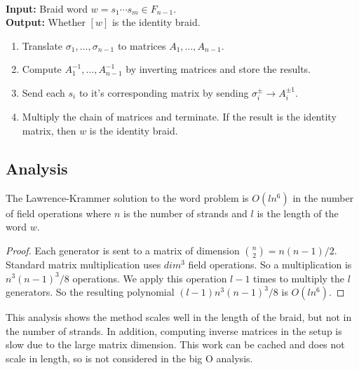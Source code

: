 \documentclass[12pt]{thesis}
\begin{document}
\begin{algorithm}

    ~\\
    \textbf{Input:} Braid word $w = s_{1} \cdots s_{m} \in F_{n-1}$. ~\\
    \textbf{Output:} Whether $[w]$ is the identity braid. 

\begin{enumerate}
    \item Translate $\sigma_{1}, \dots, \sigma_{n-1}$
            to matrices $A_{1}, \ldots, A_{n-1}$.

    \item Compute $A_{1}^{-1}, \ldots, A_{n-1}^{-1}$ by inverting matrices and store the results.

    \item Send each $s_{i}$ to it's corresponding matrix
        by sending $\sigma_{i}^{\pm} \rightarrow A_{i}^{\pm 1}$.

    \item Multiply the chain of matrices and terminate.
          If the result is the identity matrix, then $w$ is the identity braid.
\end{enumerate}

\end{algorithm}

\subsection{Analysis}

\begin{proposition}
    \label{prop:lk-runtime}
    The Lawrence-Krammer solution to the word problem
    is $O(ln^{6})$ in the number of field operations where $n$ is the number
    of strands and $l$ is the length of the word $w$.
\end{proposition}

\begin{proof}
    Each generator is sent to a matrix of dimension ${ n \choose 2 } = n(n-1)/2$.
    Standard matrix multiplication uses $dim^{3}$ field operations.
    So a multiplication is $n^{3}(n-1)^{3}/8$ operations.
    We apply this operation $l-1$ times to multiply the $l$ generators.
    So the resulting polynomial $(l -1) n^{3}(n-1)^{3}/8$ is $O(ln^{6})$.
\end{proof}

This analysis shows the method scales well in the length of the braid,
but not in the number of strands.
In addition, computing inverse
matrices in the setup is slow due to the large matrix dimension.
This work can be cached and does not scale in length,
so is not considered in the big O analysis.
\end{document}
